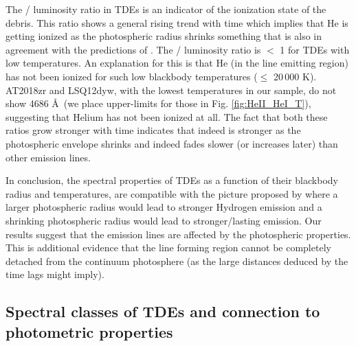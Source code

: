 \documentclass[structabstract]{aa}
\begin{document}
The / luminosity ratio in TDEs is an indicator of the ionization state of the debris. This ratio shows a general rising trend with time which implies that He is getting ionized as the photospheric radius shrinks something that is also in agreement with the predictions of \citet{Roth2016}. The / luminosity ratio is $<$ 1 for TDEs with low temperatures. An explanation for this is that He (in the line emitting region) has not been ionized for such low blackbody temperatures ($\leq$ 20\,000 K). AT2018zr and LSQ12dyw, with the lowest temperatures in our sample, do not show  4686 \AA\, (we place upper-limits for those in Fig. \ref{fig:HeII_HeI_T}), suggesting that Helium has not been ionized at all. The fact that both these ratios grow stronger with time indicates that  indeed is stronger as the photospheric envelope shrinks \citep{Roth2016} and indeed fades slower (or increases later) than other emission lines.

In conclusion, the spectral properties of TDEs as a function of their blackbody radius and temperatures, are compatible with the picture proposed by \citet{Roth2016} where a larger photospheric radius would lead to stronger Hydrogen emission and a shrinking photospheric radius would lead to stronger/lasting  emission. Our results suggest that the emission lines are affected by the photospheric properties. This is additional evidence that the line forming region cannot be completely detached from the continuum photosphere (as the large distances deduced by the time lags might imply). 


\subsection{Spectral classes of TDEs and connection to photometric properties} \label{subsec:dbsc}
\end{document}
